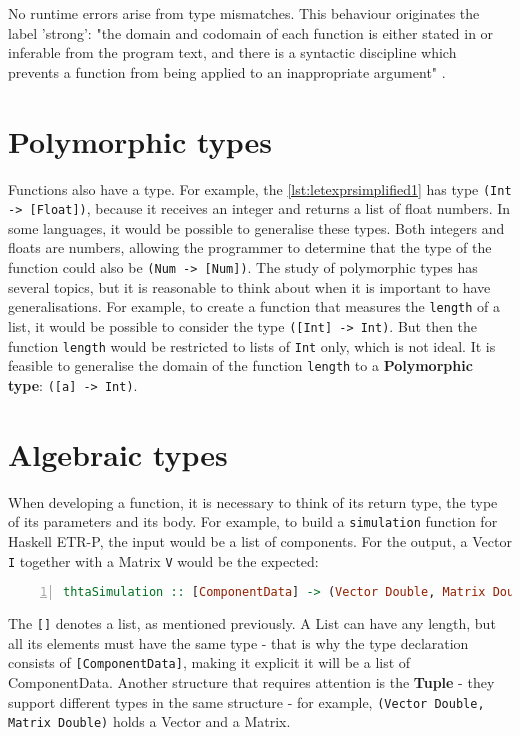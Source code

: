 No runtime errors arise from type mismatches. This behaviour originates the label 'strong': "the domain and codomain of each function is either stated in or inferable from the program text, and there is a syntactic discipline which prevents a function from being applied to an inappropriate argument" \cite{turner1995elementary}.

\section{Polymorphic types}

Functions also have a type. For example, the \cref{lst:letexprsimplified1} has type \lstinline!(Int -> [Float])!, because it receives an integer and returns a list of float numbers. In some languages, it would be possible to generalise these types. Both integers and floats are numbers, allowing the programmer to determine that the type of the function could also be \lstinline!(Num -> [Num])!. The study of polymorphic types has several topics, but it is reasonable to think about when it is important to have generalisations. For example, to create a function that measures the \lstinline!length! of a list, it would be possible to consider the type \lstinline!([Int] -> Int)!. But then the function \lstinline!length! would be restricted to lists of \lstinline!Int! only, which is not ideal. It is feasible to generalise the domain of the function \lstinline!length! to a \textbf{Polymorphic type}: \lstinline!([a] -> Int)!.

\section{Algebraic types}


When developing a function, it is necessary to think of its return type, the type of its parameters and its body. For example, to build a \lstinline!simulation! function for Haskell ETR-P, the input would be a list of components. For the output, a Vector \lstinline!I! together with a Matrix \lstinline!V! would be the expected:

\begin{lstlisting}[language=Haskell, numbers=left, caption={Haskell ETR-P simulation function}, captionpos=b, label={lst:mainfnlit}]
thtaSimulation :: [ComponentData] -> (Vector Double, Matrix Double)
\end{lstlisting}

The \lstinline![]! denotes a list, as mentioned previously. A List can have any length, but all its elements must have the same type - that is why the type declaration consists of \lstinline![ComponentData]!, making it explicit it will be a list of ComponentData. Another structure that requires attention is the \textbf{Tuple} - they support different types in the same structure - for example, \lstinline!(Vector Double, Matrix Double)! holds a Vector and a Matrix.

